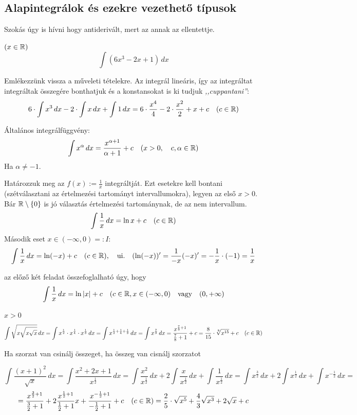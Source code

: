 \documentclass[a4paper,11.5pt]{article}
\begin{document}
	\subsection{Alapintegrálok és ezekre vezethető típusok}
	Szokás úgy is hívni hogy antiderivált, mert az annak az ellentettje.
	\begin{task}$(x\in\mathbb{R})$
		\[\int(6x^3-2x+1)\,dx\]
	\end{task}
	Emlékezzünk vissza a műveleti tételekre. Az integrál lineáris, így az integráltat integráltak összegére bonthatjuk és a konstansokat is ki tudjuk \textit{,,cuppantani''}:
	\[ 6\cdot\int x^3\,dx-2\cdot\int x\,dx+\int1\,dx=6\cdot\frac{x^4}{4}-2\cdot\frac{x^2}{2}+x+c\quad (c\in\mathbb{R}) \]
	\begin{theorem}
		Általános integrálfüggvény:
		\[ \int x^\alpha\,dx=\frac{x^{\alpha+1}}{\alpha+1}+c\quad (x>0,\quad  c,\alpha\in\mathbb{R}) \]
		Ha $\alpha\not=-1$.
	\end{theorem}
	\begin{task}Határozzuk meg az $f(x):=\frac{1}{x}$ integráltját. Ezt esetekre kell bontani (szétválasztani az értelmezési tartományt intervallumokra), legyen az első $x>0$. Bár $\mathbb{R}\setminus\{0\}$ is jó választás értelmezési tartománynak, de az nem intervallum.
		\[ \int\frac{1}{x}\,dx=\ln x+c\quad (c\in\mathbb{R}) \]
		Második eset $x\in(-\infty,0)=:I$:
		\[ \int\frac{1}{x}\,dx=\ln(-x)+c\quad (c\in\mathbb{R}),\quad \text{ui.}\quad (\ln(-x))'=\frac{1}{-x}(-x)'=-\frac{1}{x}\cdot(-1)=\frac{1}{x} \]
	\end{task}
	\begin{note}
		az előző két feladat összefoglalható úgy, hogy 
		\[ \int\frac{1}{x}\,dx=\ln|x|+c\quad (c\in\mathbb{R}, x\in(-\infty,0)\quad \text{vagy}\quad (0,+\infty) \]
	\end{note}
	\begin{task}$x>0$
		\[ \int\sqrt{x\sqrt{x\sqrt{x}}}\,dx=\int x^\frac{1}{2}\cdot x^\frac{1}{4}\cdot x^\frac{1}{8}\, dx=\int x^{\frac{1}{2}+\frac{1}{4}+\frac{1}{8}}\,dx=\int x^{\frac{7}{8}}\,dx=\frac{x^{\frac{7}{8}+1}}{\frac{7}{8}+1}+c=\frac{8}{15}\cdot\sqrt[8]{x^{15}}+c\quad (c\in\mathbb{R}) \]
	\end{task}
	\begin{note}
		Ha szorzat van csinálj összeget, ha összeg van cisnálj szorzatot
	\end{note}
	\begin{task}
		\[ \int\frac{(x+1)^2}{\sqrt{x}}\,dx=\int\frac{x^2+2x+1}{x^\frac{1}{2}}\,dx=\int\frac{x^2}{x^{\frac{1}{2}}}\,dx+2\int\frac{x}{x^\frac{1}{2}}\,dx+\int\frac{1}{x^\frac{1}{2}}\,dx=\int x^\frac{3}{2}\,dx+2\int x^\frac{1}{2}\,dx+\int x^{-\frac{1}{2}}\,dx= \]
		\[=\frac{x^{\frac{3}{2}+1}}{\frac{3}{2}+1}+2\frac{x^{\frac{1}{2}+1}}{\frac{1}{2}+1}x+\frac{x^{-\frac{1}{2}+1}}{-\frac{1}{2}+1}+c\quad (c\in\mathbb{R}) =\frac{2}{5}\cdot\sqrt{x^5}+\frac{4}{3}\sqrt{x^3}+2\sqrt{x}+c \]
	\end{task}
\end{document}
